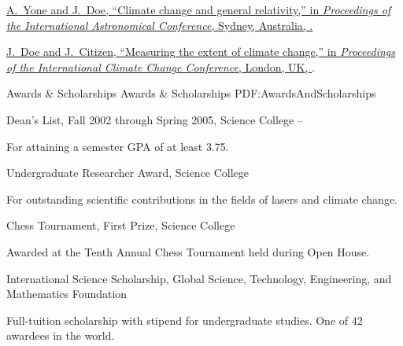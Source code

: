 \documentclass[letterpaper,MMMyyyy,nonstopmode]{simpleresumecv}
\begin{document}
\begin{Body}
  \Gap
    \NumberedItem{[100]}
    \href{http://www.example.com/my-paper-doi-2}
    {A.~Yone and \underline{J.~Doe},
    ``Climate change and general relativity,''
    in \textit{Proceedings of the International Astronomical Conference},
    Sydney, Australia,
    .}

  \Gap
  \NumberedItem{[10]}
  \href{http://www.example.com/my-paper-doi-1}
  {\underline{J.~Doe} and J.~Citizen,
  ``Measuring the extent of climate change,''
  in \textit{Proceedings of the International Climate Change Conference},
  London, UK,
  }
  .

  \endgroup


  \Section
  {Awards \&\newline
  Scholarships}
  {Awards \& Scholarships}
  {PDF:AwardsAndScholarships}

  \BulletItem
    Dean's List,
    Fall 2002 through Spring 2005,
    Science College
    \hfill
     --
    \begin{Detail}
    \Item
    For attaining a semester GPA of at least 3.75.
    \end{Detail}

  \Gap
    \BulletItem
      Undergraduate Researcher Award,
      Science College
      \hfill
      \begin{Detail}
      \Item
      For outstanding scientific contributions in the fields of lasers and climate change.
      \end{Detail}

  \Gap
    \BulletItem
      Chess Tournament,
      First Prize,
      Science College
      \hfill
      \begin{Detail}
      \Item
      Awarded at the Tenth Annual Chess Tournament held during Open House.
      \end{Detail}

  \Gap
    \BulletItem
      International Science Scholarship,
      \hfill
      \newline
      Global Science, Technology, Engineering, and Mathematics Foundation
      \begin{Detail}
      \Item
      Full-tuition scholarship with stipend for undergraduate studies.
      One of 42 awardees in the world.
      \end{Detail}


\end{Body}
\end{document}
